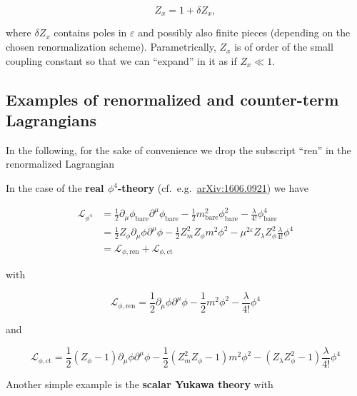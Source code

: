 \documentclass[../FeynCalcManual.tex]{subfiles}
\begin{document}
\begin{equation}
Z_x = 1 + \delta Z_x,
\end{equation}

where \(\delta Z_x\) contains poles in \(\varepsilon\) and possibly also
finite pieces (depending on the chosen renormalization scheme).
Parametrically, \(Z_x\) is of order of the small coupling constant so
that we can ``expand'' in it as if \(Z_x \ll 1\).

\hypertarget{examples-of-renormalized-and-counter-term-lagrangians}{%
\subsection{Examples of renormalized and counter-term
Lagrangians}\label{examples-of-renormalized-and-counter-term-lagrangians}}

In the following, for the sake of convenience we drop the subscript
``ren'' in the renormalized Lagrangian

In the case of the \textbf{real \(\phi^4\)-theory}
(cf.~e.g.~\href{https://arxiv.org/pdf/1606.09210.pdf}{arXiv:1606.0921})
we have

\begin{align*}
\mathcal{L}_{\phi^4} &= \frac{1}{2} \partial_\mu \phi_{\textrm{bare}} \partial^\mu \phi_{\textrm{bare}} - \frac{1}{2} m_{\textrm{bare}}^2 \phi_{\textrm{bare}}^2 - \frac{\lambda}{4!} \phi_{\textrm{bare}}^4 \\
& = \frac{1}{2} Z_\phi \partial_\mu \phi \partial^\mu \phi - \frac{1}{2} Z_m^2 Z_\phi m^2 \phi^2 - \mu^{2 \varepsilon} Z_\lambda Z_\phi^2 \frac{\lambda}{4!} \phi^4 \\
 & = \mathcal{L}_{\phi,\textrm{ren}} + \mathcal{L}_{\phi,\textrm{ct}}
\end{align*}

with

\begin{equation}
\mathcal{L}_{\phi,{\textrm{ren}}} = \frac{1}{2} \partial_\mu \phi \partial^\mu \phi - \frac{1}{2} m^2 \phi^2 - \frac{\lambda}{4!} \phi^4
\end{equation}

and

\begin{equation}
\mathcal{L}_{\phi,{\textrm{ct}}} = \frac{1}{2} (Z_\phi - 1) \partial_\mu \phi \partial^\mu \phi - \frac{1}{2} (Z_m^2 Z_\phi - 1) m^2 \phi^2 - (Z_\lambda Z_\phi^2 - 1) \frac{\lambda}{4!} \phi^4
\end{equation}

Another simple example is the \textbf{scalar Yukawa theory} with
\end{document}
